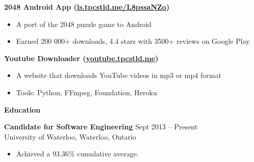 \documentclass{letter}
\begin{document}
\vspace{-1.5mm}
{\bfseries 2048 Android App (\href{http://ls.tpcstld.me/L8pssaNZo}{\uline{ls.tpcstld.me/L8pssaNZo}})}
\vspace{-3mm}
\begin{itemize}
    \item A port of the 2048 puzzle game to Android
    \item Earned 200 000+ downloads, 4.4 stars with 3500+ reviews on Google Play
\end{itemize}
\vspace{-3mm}
{\bfseries Youtube Downloader (\href{http://youtube.tpcstld.me}{\uline{youtube.tpcstld.me}})}
\vspace{-3mm}
\begin{itemize}
    \item A website that downloads YouTube videos in mp3 or mp4 format
    \item Tools: Python, FFmpeg, Foundation, Heroku
\end{itemize}

{\bfseries \Large Education}

\vspace{-1.5mm}
{\bfseries Candidate for Software Engineering} \hfill Sept 2013 -- Present \\
University of Waterloo, Waterloo, Ontario
\vspace{-3mm}
\begin{itemize}
    \item Achieved a 93.36\% cumulative average.
\end{itemize}
\end{document}
